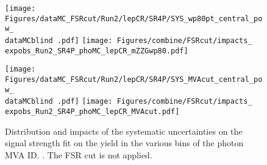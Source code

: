 \begin{figure}
  \centering
  \texttt{[image: Figures/dataMC\_FSRcut/Run2/lepCR/SR4P/SYS\_wp80pt\_central\_pow\_\\dataMCblind .pdf]}
  \hfill
  \texttt{[image: Figures/combine/FSRcut/impacts\_\\expobs\_Run2\_SR4P\_phoMC\_lepCR\_mZZGwp80.pdf]}
  \caption{}
  \label{fig:FSRcut_mvaID_phoMC_mZZGwp80}
\end{figure}

\begin{figure}
  \centering
  \texttt{[image: Figures/dataMC\_FSRcut/Run2/lepCR/SR4P/SYS\_MVAcut\_central\_pow\_\\dataMCblind .pdf]}
  \hfill
  \texttt{[image: Figures/combine/FSRcut/impacts\_\\expobs\_Run2\_SR4P\_phoMC\_lepCR\_MVAcut.pdf]}
  \caption{Distribution and impacts of the systematic uncertainties on the signal strength fit
    on the yield in the various bins of the photon MVA ID.
    .
    The FSR cut is not applied.
  }
  \label{fig:FSRcut_kin_phoMC_MVAcut}
\end{figure}
